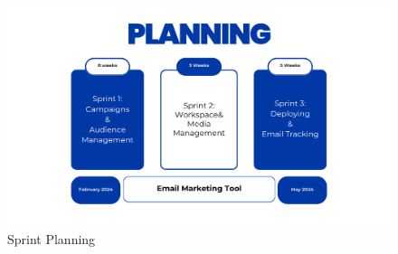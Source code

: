 \begin{figure}[ht]
    \centering
    \includegraphics[width=\linewidth]{Images//images/planning.png}
    \caption{Sprint Planning}
    \label{fig:Sprint Planning}
\end{figure}


